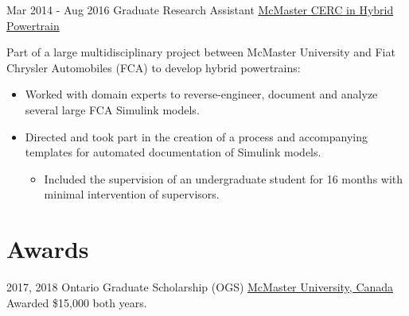 \documentclass[letterpaper]{twentysecondcv} %
\begin{document}
\begin{twenty}
  \twentyitem
	{Mar 2014 -}
	{Aug 2016}
	{Graduate Research Assistant}
	{\href{http://hybrid.mcmaster.ca/}{McMaster CERC in Hybrid Powertrain}}
	{}
	{Part of a large multidisciplinary project
    between McMaster University and Fiat Chrysler Automobiles (FCA) to develop
    hybrid powertrains:
    \begin{itemize}
			\item Worked with domain experts to reverse-engineer, document and analyze several large FCA Simulink models.
			\item Directed and took part in the creation of a process and accompanying templates for automated documentation of Simulink models.
      \begin{itemize}
        \item Included the supervision of an undergraduate student for 16 months with minimal intervention of supervisors.
      \end{itemize}
  \end{itemize}}
\end{twenty} 

\vspace{-0.5em}
\section{Awards}
\vspace{-0.5em}
\begin{twenty}
  \twentyitem
  {2017,}
  {2018}
  {Ontario Graduate Scholarship (OGS)}
  {\href{https://www.mcmaster.ca/}{McMaster University, Canada}}
  {}
  {Awarded \$15,000 both years.}
\end{twenty}
\end{document}
